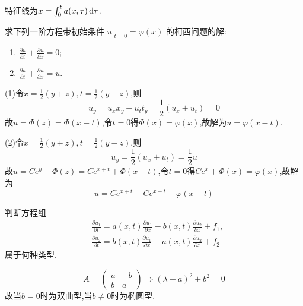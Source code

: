 \begin{solve}
  特征线为$x=\int_0^ta(x,\tau)\mathop{}\!\mathrm{d}\tau$.
\end{solve}


\begin{exercise}
  求下列一阶方程带初始条件 $u|_{t=0} = \varphi(x)$ 的柯西问题的解:
  \begin{enumerate}[(1)]
    \item $\frac{\partial u}{\partial t} + \frac{\partial u}{\partial x} = 0$;
    \item $\frac{\partial u}{\partial t} + \frac{\partial u}{\partial x} = u$.
  \end{enumerate}
\end{exercise}

\begin{solve}
  (1)令$x=\frac{1}{2}(y+z),t=\frac{1}{2}(y-z)$,则
  \[u_y=u_xx_y+u_tt_y=\frac{1}{2}(u_x+u_t)=0\]
  故$u=\Phi(z)=\Phi(x-t)$,令$t=0$得$\Phi(x)=\varphi(x)$,故解为$u=\varphi(x-t)$.

  (2)令$x=\frac{1}{2}(y+z),t=\frac{1}{2}(y-z)$,则
  \[u_y=\frac{1}{2}(u_x+u_t)=\frac{1}{2}u\]
  故$u=Ce^y+\Phi(z)=Ce^{x+t}+\Phi(x-t)$,令$t=0$得$Ce^x+\Phi(x)=\varphi(x)$,故解为
  \[u=Ce^{x+t}-Ce^{x-t}+\varphi(x-t)\]
\end{solve}


\begin{exercise}
  判断方程组
  \begin{align*}
    & \frac{\partial u_1}{\partial t} = a(x,t) \frac{\partial u_1}{\partial x}
      - b(x,t) \frac{\partial u_2}{\partial x} + f_1, \\
    & \frac{\partial u_2}{\partial t} = b(x,t) \frac{\partial u_1}{\partial x}
      + a(x,t) \frac{\partial u_2}{\partial x} + f_2
  \end{align*}
  属于何种类型.
\end{exercise}

\begin{solve}
  \[A=\begin{pmatrix}
  a&-b\\b&a
  \end{pmatrix}\Rightarrow(\lambda-a)^2+b^2=0\]
  故当$b=0$时为双曲型,当$b\neq0$时为椭圆型.
\end{solve}


